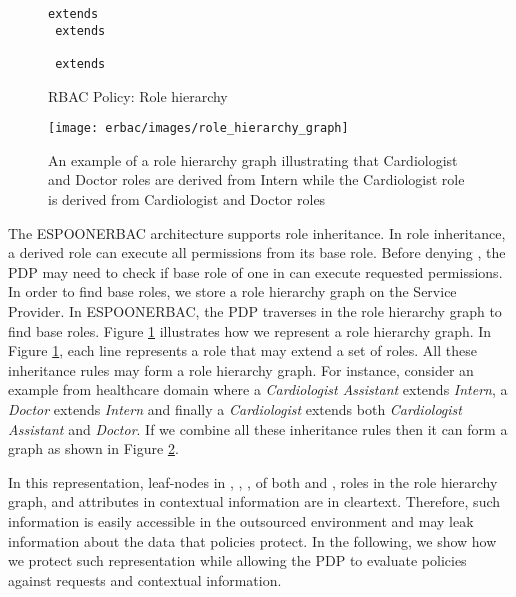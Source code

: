 \documentclass[epsfig,a4paper,11pt,titlepage]{book}
\numberwithin{algorithm}{chapter}
\newcommand{\Keywords}{\lstset{keywords={if,then,can,be,active,in,execute}}}
\begin{document}
\begin{figure} [htp]
\Keywords
\begin{lstlisting}[style=AMMA,numbers=none,breaklines,mathescape,rulesepcolor=\color{black}]
 extends 
 extends 

 extends 

\end{lstlisting}
\caption[RBAC Policy: Role hierarchy]{\gls{RBAC} Policy: Role hierarchy}
\label{fig:erbac-policy-role-hierarchy}
\end{figure}

\begin{figure} [htp]
\centering
\texttt{[image: erbac/images/role\_hierarchy\_graph]}
\caption[An example of a role hierarchy graph]{An example of a role hierarchy graph illustrating that Cardiologist and Doctor roles are derived from Intern while the Cardiologist role is derived from Cardiologist and Doctor roles}
\label{fig:erbac-role_hierarchy_graph}
\end{figure}

The \gls{ESPOONERBAC} architecture supports role inheritance. In role inheritance, a derived role can execute all permissions from its base role. Before denying , the \gls{PDP} may need to check if base role of one in  can execute requested permissions. In order to find base roles, we store a role hierarchy graph on the Service Provider. In \gls{ESPOONERBAC}, the \gls{PDP} traverses in the role hierarchy graph to find base roles. Figure \ref{fig:erbac-policy-role-hierarchy} illustrates how we represent a role hierarchy graph. In Figure \ref{fig:erbac-policy-role-hierarchy}, each line represents a role that may extend a set of roles. All these inheritance rules may form a role hierarchy graph. For instance, consider an example from healthcare domain where a \emph{Cardiologist Assistant} extends \emph{Intern}, a \emph{Doctor} extends \emph{Intern} and finally a \emph{Cardiologist} extends both \emph{Cardiologist Assistant} and \emph{Doctor}. If we combine all these inheritance rules then it can form a graph as shown in Figure \ref{fig:erbac-role_hierarchy_graph}.

In this representation, leaf-nodes in , , ,  of both  and , roles in the role hierarchy graph, and attributes in contextual information are in cleartext. Therefore, such information is easily accessible in the outsourced environment and may leak information about the data that policies protect. In the following, we show how we protect such representation while allowing the \gls{PDP} to evaluate policies against requests and contextual information.
\end{document}
